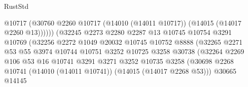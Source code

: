 \begin{lexlean}{RustStd}
\begin{coremodule}
                                            @10717
                                            (@30760
                                              @2260
                                              @10717
                                              (@14010 (@14011 @10717))
                                              (@14015 (@14017 @2260 @13))))))
                                      (@32245
                                        @2273
                                        @2280
                                        @2287
                                        @13
                                        @10745
                                        @10754
                                        @3291
                                        @10769
                                        (@32256
                                          @2272
                                          @1049
                                          @20032
                                          @10745
                                          @10752
                                          @8888
                                          (@32265
                                            @2271
                                            @53
                                            @55
                                            @3974
                                            @10744
                                            @10751
                                            @3252
                                            @10725
                                            @3258
                                            @30738
                                            (@32264
                                              @2269
                                              @106
                                              @53
                                              @16
                                              @10741
                                              @3291
                                              @3271
                                              @3252
                                              @10735
                                              @3258
                                              (@30698
                                                @2268
                                                @10741
                                                (@14010 (@14011 @10741))
                                                (@14015 (@14017 @2268 @53)))
                                              @30665
                                              @14145

\end{coremodule}
\end{lexlean}

